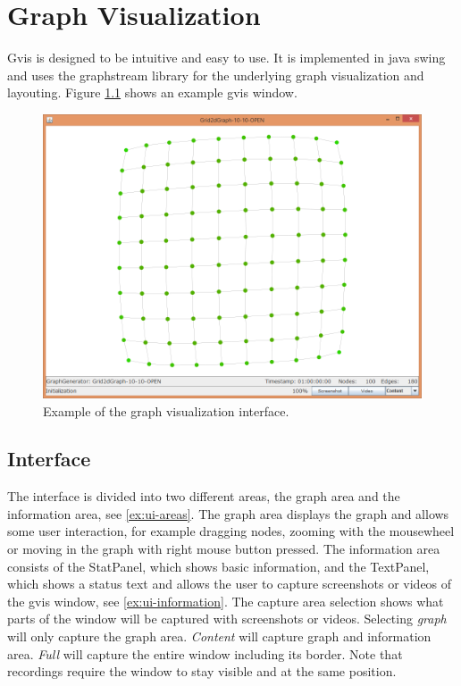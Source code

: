 \chapter{Graph Visualization}
Gvis is designed to be intuitive and easy to use. It is implemented in java swing and uses the graphstream library \cite{graphstream} for the underlying graph visualization and layouting. Figure \ref{ex:ui-full} shows an example gvis window.

\begin{figure} [h]
\centering
\includegraphics [scale=0.45] {images/ui-full}
\caption{Example of the graph visualization interface.}
\label{ex:ui-full}
\end{figure}

\section{Interface}
\label{s:interface}
The interface is divided into two different areas, the graph area and the information area, see \ref{ex:ui-areas}. The graph area displays the graph and allows some user interaction, for example dragging nodes, zooming with the mousewheel or moving in the graph with right mouse button pressed. The information area consists of the StatPanel, which shows basic information, and the TextPanel, which shows a status text and allows the user to capture screenshots or videos of the gvis window, see \ref{ex:ui-information}. The capture area selection shows what parts of the window will be captured with screenshots or videos. Selecting \emph{graph} will only capture the graph area. \emph{Content} will capture graph and information area. \emph{Full} will capture the entire window including its border. Note that recordings require the window to stay visible and at the same position.

